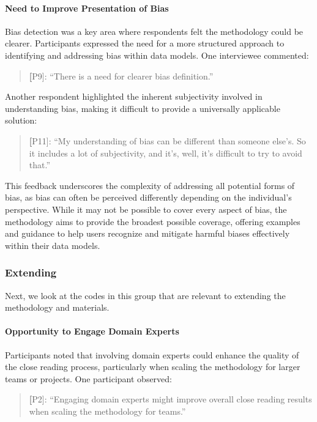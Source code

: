 \paragraph{Need to Improve Presentation of Bias} Bias detection was a key area where respondents felt the methodology could be clearer. Participants expressed the need for a more structured approach to identifying and addressing bias within data models. One interviewee commented:

\begin{quote} \textbf[P9]: ``There is a need for clearer bias definition.'' \end{quote}

Another respondent highlighted the inherent subjectivity involved in understanding bias, making it difficult to provide a universally applicable solution:

\begin{quote} \textbf[P11]: ``My understanding of bias can be different than someone else's. So it includes a lot of subjectivity, and it's, well, it's difficult to try to avoid that.'' \end{quote}

This feedback underscores the complexity of addressing all potential forms of bias, as bias can often be perceived differently depending on the individual's perspective. While it may not be possible to cover every aspect of bias, the methodology aims to provide the broadest possible coverage, offering examples and guidance to help users recognize and mitigate harmful biases effectively within their data models.

\subsubsection{Extending \credal}
Next, we look at the codes in this group that are relevant to extending the methodology and materials.

\paragraph{Opportunity to Engage Domain Experts} Participants noted that involving domain experts could enhance the quality of the close reading process, particularly when scaling the methodology for larger teams or projects. One participant observed:

\begin{quote} \textbf[P2]: ``Engaging domain experts might improve overall close reading results when scaling the methodology for teams.'' \end{quote}

